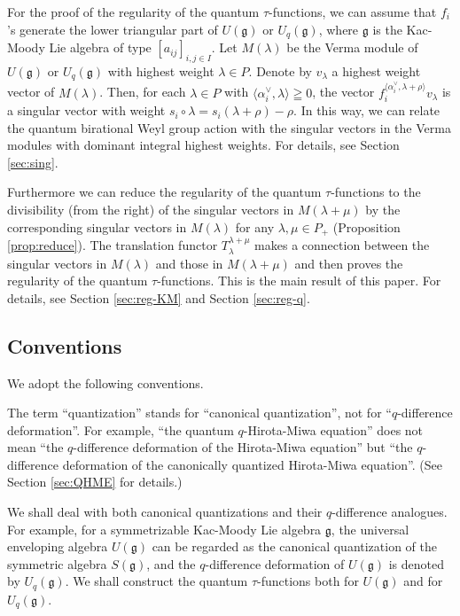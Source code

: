 \documentclass[12pt,twoside]{article}
\newcommand\bra{\langle}
\newcommand\ket{\rangle}
\newcommand\av{\alpha^\vee}
\newcommand\g{{\mathfrak g}}
\theoremstyle{plain} %
\theoremstyle{definition} %
\theoremstyle{definition} %
\numberwithin{theorem}{section}
\numberwithin{equation}{section}
\numberwithin{figure}{section}
\numberwithin{table}{section}
\newcommand\secref[1]{Section \ref{#1}}
\newcommand\propref[1]{Proposition \ref{#1}}
\begin{document}
For the proof of the regularity of the quantum $\tau$-functions, 
we can assume that $f_i$'s generate the lower triangular part of $U(\g)$ or $U_q(\g)$,
where $\g$ is the Kac-Moody Lie algebra of type $[a_{ij}]_{i,j\in I}$.
Let $M(\lambda)$ be the Verma module of $U(\g)$ or $U_q(\g)$ 
with highest weight $\lambda\in P$.
Denote by $v_\lambda$ a highest weight vector of $M(\lambda)$.
Then, for each $\lambda\in P$ with $\bra\av_i,\lambda\ket\geqq0$, 
the vector $f_i^{\bra\av_i,\lambda+\rho\ket}v_\lambda$ 
is a singular vector with weight $s_i\circ\lambda=s_i(\lambda+\rho)-\rho$.
In this way, we can relate the quantum birational Weyl group action 
with the singular vectors in the Verma modules with dominant integral
highest weights.
For details, see \secref{sec:sing}.

Furthermore we can reduce the regularity of the quantum 
$\tau$-functions to the divisibility (from the right) of the singular vectors
in $M(\lambda+\mu)$ by the corresponding singular vectors in $M(\lambda)$ 
for any $\lambda,\mu\in P_+$ (\propref{prop:reduce}).
The translation functor $T_\lambda^{\lambda+\mu}$ makes a connection between 
the singular vectors in $M(\lambda)$ and those in $M(\lambda+\mu)$
and then proves the regularity of the quantum $\tau$-functions. 
This is the main result of this paper.
For details, see \secref{sec:reg-KM} and \secref{sec:reg-q}.


\subsection{Conventions}

We adopt the following conventions.

The term ``quantization'' stands for ``canonical quantization'',
not for ``$q$-difference deformation''.
For example, ``the quantum $q$-Hirota-Miwa equation''
does not mean ``the $q$-difference deformation of the Hirota-Miwa equation''
but ``the $q$-difference deformation of the canonically quantized Hirota-Miwa equation''. 
(See \secref{sec:QHME} for details.)

We shall deal with both canonical quantizations and their $q$-difference analogues. 
For example, for a symmetrizable Kac-Moody Lie algebra $\g$, 
the universal enveloping algebra $U(\g)$ can be regarded as 
the canonical quantization of the symmetric algebra $S(\g)$,
and the $q$-difference deformation of $U(\g)$ is denoted by $U_q(\g)$.
We shall construct the quantum $\tau$-functions both for $U(\g)$ and for $U_q(\g)$.
\end{document}
